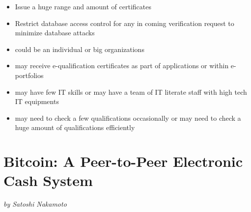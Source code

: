 
\begin{itemize}
    \item Issue a huge range and amount of certificates

    \item Restrict database access control for any in coming verification request to minimize database attacks
  \end{itemize}

    \begin{itemize}
        \item could be an individual or big organizations
        \item may receive e-qualification certificates as part of applications or within e-portfolios
\item may have few IT skills or may have a team of IT literate staff with high tech IT equipments
\item may need to check a few qualifications occasionally or may need to check a huge amount of qualifications efficiently
      \end{itemize}
    
\section*{Bitcoin: A Peer-to-Peer Electronic Cash System
}

\textit{by Satoshi Nakamoto }\cite{bitcoin_paper}\\

